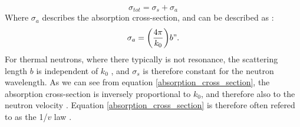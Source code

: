 \begin{equation}\label{total_scat_cross_section}
	\sigma_{tot} = \sigma_s + \sigma_a
\end{equation}
Where $\sigma_a$ describes the absorption cross-section, and can be described as \cite{sears_cross_sections}:
\begin{equation}\label{absorption_cross_section}
	\sigma_a = \qty(\frac{4\pi}{k_0}) b".
\end{equation}
For thermal neutrons, where there typically is not resonance, the scattering length $b$ is independent of $k_0$ \cite{cross_section_detailed}, and $\sigma_s$ is therefore constant for the neutron wavelength. As we can see from equation \ref{absorption_cross_section}, the absorption cross-section is inversely proportional to $k_0$, and therefore also to the neutron velocity \cite{classic_fermi}. Equation \ref{absorption_cross_section} is therefore often refered to as the 1/$v$ law \cite{sears1982fundamental}. 
